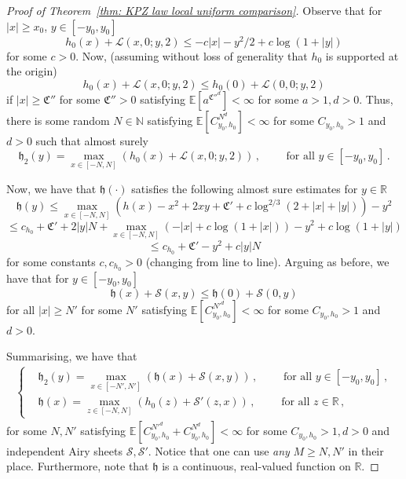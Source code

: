 \documentclass[11pt, reqno]{amsart}
\numberwithin{equation}{section}
\newcommand{\N}{\ensuremath{\mathbb{N}}}
\newcommand{\R}{\ensuremath{\mathbb{R}}}
\begin{document}
\begin{proof}[Proof of Theorem~\ref{thm: KPZ law local uniform comparison}]
Observe that for $|x|\ge x_0$, $y\in [-y_0,y_0]$
\begin{equation*}
h_0(x) + \mathcal{L}(x,0;y,2)\le -c|x|-y^2/2+c\log(1+|y|)
\end{equation*}
for some $c>0$. Now, (assuming without loss of generality that $h_0$ is supported at the origin)
\begin{equation*}
h_0(x) + \mathcal{L}(x,0;y,2)\le h_0(0)+\mathcal{L}(0,0;y,2)
\end{equation*}
if $|x|\ge \mathfrak{C}''$
for some $\mathfrak{C}''>0$ satisfying $\mathbb{E}[a^{\mathfrak{C}''^{d}}]<\infty$ for some $a>1, d>0$. Thus, there is some random $N\in \N$ satisfying $\mathbb{E}[C_{y_0, h_0}^{N^{d}}]<\infty$ for some $C_{y_0, h_0}>1$ and $d>0$ such that almost surely
\begin{equation*}
\mathfrak{h}_2(y) = \displaystyle\max_{x\in [-N, N]}(h_0(x) + \mathcal{L}(x,0;y,2))\,,\qquad \text{ for all } y\in [-y_0, y_0]\,.
\end{equation*}

Now, we have that $\mathfrak{h}(\cdot)$ satisfies the following almost sure estimates for $y\in\R$
\begin{equation*}
\mathfrak{h}(y)\le \displaystyle\max_{x\in [-N,N]}(h(x)-x^2+2xy+\mathfrak{C}'+c\log^{2/3}(2+|x|+|y|))-y^2
\end{equation*}
\begin{equation*}
\le c_{h_0} + \mathfrak{C}' + 2|y|N + \displaystyle\max_{x\in [-N,N]}(-|x|+c\log(1+|x|))-y^2+c\log(1+|y|)
\end{equation*}
\begin{equation*}
\le c_{h_0} + \mathfrak{C}' -y^2+c|y|N
\end{equation*}
for some constants $c, c_{h_0}>0$ (changing from line to line). Arguing as before, we have that for $y\in [-y_0, y_0]$
\begin{equation*}
\mathfrak{h}(x) + \mathcal{S}(x,y)\le \mathfrak{h}(0)+\mathcal{S}(0,y)
\end{equation*}
for all $|x|\ge N'$
for some $N'$ satisfying $\mathbb{E}[C_{y_0, h_0}^{N'^{d}}]<\infty$ for some $C_{y_0, h_0}>1$ and $d>0$. 

Summarising, we have that
\begin{align}\label{eq: KPZ fixed point loc}
    \begin{cases}
        & \mathfrak{h}_2(y) = \displaystyle\max_{x\in [-N', N']}(\mathfrak{h}(x) + \mathcal{S}(x,y))\,,\qquad \text{ for all } y\in [-y_0, y_0]\,,\\
        & \mathfrak{h}(x) = \displaystyle\max_{z\in [-N, N]}(h_0(z) + \mathcal{S}'(z,x))\,,\qquad \text{ for all } z\in \R\,,
    \end{cases}
\end{align}
for some $N, N'$ satisfying $\mathbb{E}[C_{y_0, h_0}^{N'^{d}}+C_{y_0, h_0}^{N^{d}}]<\infty$ for some $C_{y_0, h_0}>1, d>0$ and independent Airy sheets $\mathcal{S}, \mathcal{S}'$. Notice that one can use \emph{any} $M\ge N, N'$ in their place. Furthermore, note that $\mathfrak{h}$ is a continuous, real-valued function on $\R$.


\end{proof}
\end{document}
